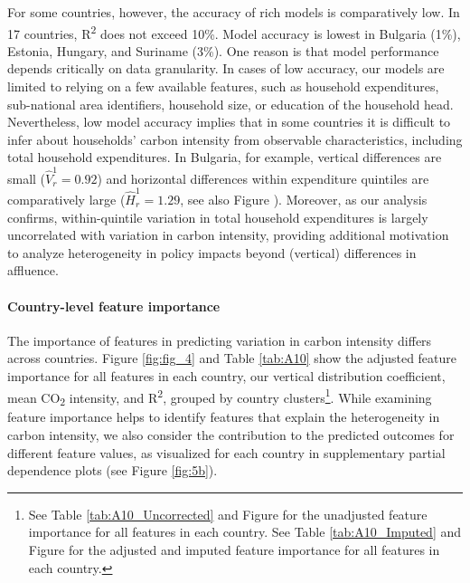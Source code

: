 \documentclass[12pt, a4paper]{article}
\begin{document}
For some countries, however, the accuracy of rich models is comparatively low. In 17 countries, R\textsuperscript{2} does not exceed 10\%. Model accuracy is lowest in Bulgaria (1\%), Estonia, Hungary, and Suriname (3\%). One reason is that model performance depends critically on data granularity. In cases of low accuracy, our models are limited to relying on a few available features, such as household expenditures, sub-national area identifiers, household size, or education of the household head. Nevertheless, low model accuracy implies that in some countries it is difficult to infer about households' carbon intensity from observable characteristics, including total household expenditures. In Bulgaria, for example, vertical differences are small ($\widehat{V}_{r}^{1}=0.92$) and horizontal differences within expenditure quintiles are comparatively large ($\widehat{H}_{r}^{1}=1.29$, see also Figure ). Moreover, as our analysis confirms, within-quintile variation in total household expenditures is largely uncorrelated with variation in carbon intensity, providing additional motivation to analyze heterogeneity in policy impacts beyond (vertical) differences in affluence.

\paragraph{Country-level feature importance}
The importance of features in predicting variation in carbon intensity differs across countries. Figure \ref{fig:fig_4} and Table \ref{tab:A10} show the adjusted feature importance for all features in each country, our vertical distribution coefficient, mean CO\textsubscript{2} intensity, and R\textsuperscript{2}, grouped by country clusters\footnote{See Table \ref{tab:A10_Uncorrected} and Figure  for the unadjusted feature importance for all features in each country. See Table \ref{tab:A10_Imputed} and Figure  for the adjusted and imputed feature importance for all features in each country.}. While examining feature importance helps to identify features that explain the heterogeneity in carbon intensity, we also consider the contribution to the predicted outcomes for different feature values, as visualized for each country in supplementary partial dependence plots (see Figure \ref{fig:5b}).
\end{document}
